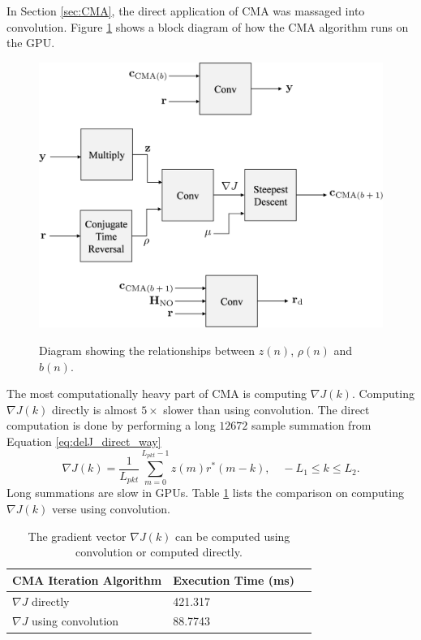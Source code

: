 In Section \ref{sec:CMA}, the direct application of CMA was massaged into convolution.
Figure \ref{fig:blockCMA} shows a block diagram of how the CMA algorithm runs on the GPU.
\begin{figure}
	\caption{Diagram showing the relationships between $z(n)$, $\rho(n)$ and $b(n)$.}
	\centering\includegraphics[width=8.34in/100*55]{figures/eq_GPUimplementation/blockCMA.pdf}
	\label{fig:blockCMA}
\end{figure}

The most computationally heavy part of CMA is computing $\nabla J(k)$.
Computing $\nabla J(k)$ directly is almost $5\times$ slower than using convolution.
The direct computation is done by performing a long $12672$ sample summation from Equation \ref{eq:delJ_direct_way}
\begin{equation}
\nabla J(k) = \frac{1}{L_{pkt}} \sum^{L_{pkt}-1}_{m=0}  z(m) r^\ast(m-k), \quad -L_1 \leq k \leq L_2.
\end{equation}
Long summations are slow in GPUs.
Table \ref{tab:CMAtimingComparison} lists the comparison on computing $\nabla J(k)$ verse using convolution.
\begin{table}
\caption{The gradient vector $\nabla J(k)$ can be computed using convolution or computed directly.}
\begin{center}
\begin{tabular}{lll}
	\toprule
	CMA	Iteration Algorithm			& Execution Time (ms)	\\ \midrule
	$\nabla J$ directly 			& 421.317				\\
	$\nabla J$ using convolution & 88.7743				\\
	\bottomrule
\end{tabular}
\end{center}
\label{tab:CMAtimingComparison}
\end{table}



